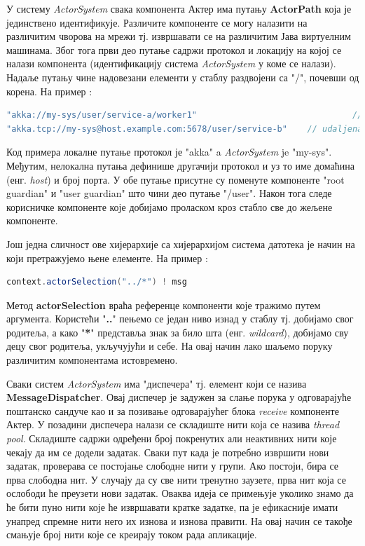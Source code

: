 \documentclass[12pt,oneside]{memoir}
\begin{document}
У систему \textit{ActorSystem} свака компонента Актер има путању \textbf{ActorPath} која је јединствено идентификује. Различите компоненте се могу налазити на различитим чворова на мрежи тј. извршавати се на различитим Јава виртуелним машинама. Због тога први део путање садржи протокол и локацију на којој се налази компонента (идентификацију система \textit{ActorSystem} у коме се налази). Надаље путању чине надовезани елементи у стаблу раздвојени са "/", почевши од корена. На пример \cite{akkaDoc}:
\begin{lstlisting}[language=Scala]
"akka://my-sys/user/service-a/worker1"                  		   	 // lokalna komponenta
"akka.tcp://my-sys@host.example.com:5678/user/service-b" 	// udaljena komponenta
\end{lstlisting}
Код примера локалне путање протокол је "akka" a \textit{ActorSystem} je "my-sys". Међутим, нелокална путања дефинише другачији протокол и уз то име домаћина (енг. \textit{host}) и број порта. У обе путање присутне су поменуте компоненте "root guardian" и "user guardian" што чини део путање "/user". Након тога следе корисничке компоненте које добијамо проласком кроз стабло све до жељене компоненте.

Још једна сличност ове хијерархије са хијерархијом система датотека је начин на који претражујемо њене елементе. На пример \cite{akkaDoc}:
\begin{lstlisting}[language=Scala]
context.actorSelection("../*") ! msg
\end{lstlisting}
Метод \textbf{actorSelection} враћа референце компоненти које тражимо путем аргумента. Користећи "\textbf{..}" пењемо се један ниво изнад у стаблу тј. добијамо свог родитеља, а како "\textbf{*}" представља знак за било шта (енг. \textit{wildcard}), добијамо сву децу свог родитеља, укључујући и себе. На овај начин лако шаљемо поруку различитим компонентама истовремено.
\par Сваки систем \textit{ActorSystem} има "диспечера" тј. елемент који се назива \textbf{MessageDispatcher}. Овај диспечер је задужен за слање порука у одговарајуће поштанско сандуче као и за позивање одговарајућег блока \textit{receive} компоненте Актер. У позадини диспечера налази се складиште нити која се назива \textit{thread pool}. Складиште садржи одређени број покренутих али неактивних нити које чекају да им се додели задатак. Сваки пут када је потребно извршити нови задатак, проверава се постојање слободне нити у групи. Ако постоји, бира се прва слободна нит. У случају да су све нити тренутно заузете, прва нит која се ослободи ће преузети нови задатак. Оваква идеја се примењује уколико знамо да ће бити пуно нити које ће извршавати кратке задатке, па је ефикасније имати унапред спремне нити него их изнова и изнова правити. На овај начин се такође смањује број нити које се креирају током рада апликације.
\end{document}
